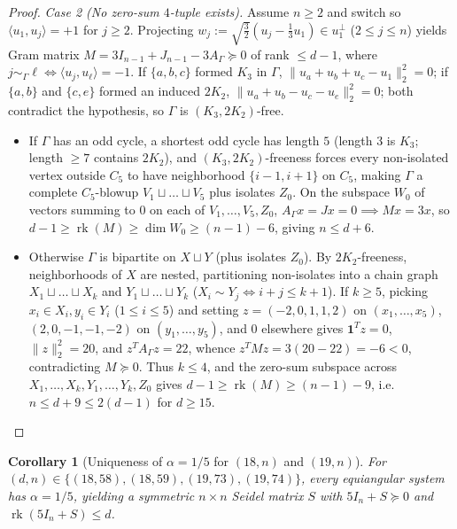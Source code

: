 \documentclass[11pt,reqno]{amsart}
\newtheorem{corollary}[theorem]{Corollary}
\theoremstyle{definition}
\theoremstyle{remark}
\numberwithin{equation}{section}
\numberwithin{table}{section}
\DeclareMathOperator{\rk}{rk}
\begin{document}
\begin{proof}
\emph{Case 2 (No zero-sum $4$-tuple exists).} Assume $n \ge 2$ and switch so $\langle u_1, u_j \rangle = +1$ for $j \ge 2$. Projecting $w_j := \sqrt{\frac{3}{2}}(u_j - \frac{1}{3}u_1) \in u_1^\perp$ ($2 \le j \le n$) yields Gram matrix $M = 3I_{n-1} + J_{n-1} - 3A_\Gamma \succeq 0$ of rank $\le d - 1$, where $j \sim_\Gamma \ell \iff \langle u_j, u_\ell \rangle = -1$. If $\{a,b,c\}$ formed $K_3$ in $\Gamma$, $\|u_a + u_b + u_c - u_1\|_2^2 = 0$; if $\{a,b\}$ and $\{c,e\}$ formed an induced $2K_2$, $\|u_a + u_b - u_c - u_e\|_2^2 = 0$; both contradict the hypothesis, so $\Gamma$ is $(K_3, 2K_2)$-free.
\begin{itemize}
  \item If $\Gamma$ has an odd cycle, a shortest odd cycle has length $5$ (length $3$ is $K_3$; length $\ge 7$ contains $2K_2$), and $(K_3, 2K_2)$-freeness forces every non-isolated vertex outside $C_5$ to have neighborhood $\{i-1, i+1\}$ on $C_5$, making $\Gamma$ a complete $C_5$-blowup $V_1 \sqcup \dots \sqcup V_5$ plus isolates $Z_0$. On the subspace $W_0$ of vectors summing to $0$ on each of $V_1, \dots, V_5, Z_0$, $A_\Gamma x = J x = 0 \implies Mx = 3x$, so $d - 1 \ge \rk(M) \ge \dim W_0 \ge (n - 1) - 6$, giving $n \le d + 6$.
  \item Otherwise $\Gamma$ is bipartite on $X \sqcup Y$ (plus isolates $Z_0$). By $2K_2$-freeness, neighborhoods of $X$ are nested, partitioning non-isolates into a chain graph $X_1 \sqcup \dots \sqcup X_k$ and $Y_1 \sqcup \dots \sqcup Y_k$ ($X_i \sim Y_j \iff i + j \le k + 1$). If $k \ge 5$, picking $x_i \in X_i, y_i \in Y_i$ ($1 \le i \le 5$) and setting $z = (-2, 0, 1, 1, 2)$ on $(x_1, \dots, x_5)$, $(2, 0, -1, -1, -2)$ on $(y_1, \dots, y_5)$, and $0$ elsewhere gives $\mathbf{1}^T z = 0$, $\|z\|_2^2 = 20$, and $z^T A_\Gamma z = 22$, whence $z^T M z = 3(20 - 22) = -6 < 0$, contradicting $M \succeq 0$. Thus $k \le 4$, and the zero-sum subspace across $X_1, \dots, X_k, Y_1, \dots, Y_k, Z_0$ gives $d - 1 \ge \rk(M) \ge (n - 1) - 9$, i.e.\ $n \le d + 9 \le 2(d - 1)$ for $d \ge 15$.\qedhere
\end{itemize}
\end{proof}

\begin{corollary}[Uniqueness of $\alpha = 1/5$ for $(18, n)$ and $(19, n)$]\label{cor:one_fifth}
For $(d, n) \in \{(18, 58),\allowbreak (18, 59),\allowbreak (19, 73),\allowbreak (19, 74)\}$, every equiangular system has $\alpha = 1/5$, yielding a symmetric $n \times n$ Seidel matrix $S$ with $5I_n + S \succeq 0$ and $\rk(5I_n + S) \le d$.
\end{corollary}
\end{document}
